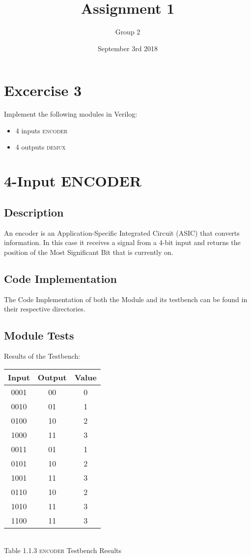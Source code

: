 \documentclass[a4paper,12pt]{article}
\begin{document}
\title{Assignment 1}
	\author{Group 2}
	\date{September 3rd 2018}
\maketitle
\newpage
\section{Excercise 3}
Implement the following modules in Verilog:
\begin {itemize}
\item 4 inputs \textsc{encoder}
\item 4 outputs \textsc{demux}
\end {itemize}

\section{4-Input ENCODER}
\subsection{Description}
An encoder is an Application-Specific Integrated Circuit (ASIC) that converts information. In this case it receives a signal from  a 4-bit input and returns the position of the Most Significant Bit that is currently on.
\subsection{Code Implementation}
The Code Implementation of both the Module and its testbench can be found in their respective directories.
\subsection{Module Tests}
Results of the Testbench:
\begin{center}
\begin{tabular}{|c|c|c|}
\hline
Input&Output&Value\\
\hline
0001&00&0\\
0010&01&1\\
0100&10&2\\
1000&11&3\\
0011&01&1\\
0101&10&2\\
1001&11&3\\
0110&10&2\\
1010&11&3\\
1100&11&3\\
\hline
\end{tabular}
\\\vspace{12pt}
Table 1.1.3 \textsc{encoder} Testbench Results
\end{center}
\end{document}
